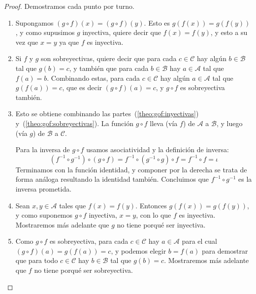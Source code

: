   \begin{proof}
    Demostramos cada punto por turno.
    \begin{enumerate}
    \item
      Supongamos \((g \circ f)(x) = (g \circ f)(y)\).
      Esto es \(g(f(x)) = g(f(y))\),
      y como supusimos \(g\) inyectiva,
      quiere decir que \(f(x) = f(y)\),
      y esto a su vez que \(x = y\) ya que \(f\) es inyectiva.
    \item
      Si \(f\) y \(g\) son sobreyectivas,
      quiere decir que para cada \(c \in \mathcal{C}\)
      hay algún \(b \in \mathcal{B}\) tal que \(g(b) = c\),
      y también que para cada \(b \in \mathcal{B}\) hay \(a \in \mathcal{A}\)
      tal que \(f(a) = b\).
      Combinando estas,
      para cada \(c \in \mathcal{C}\) hay algún \(a \in \mathcal{A}\)
      tal que \(g(f(a)) = c\),
      que es decir \((g \circ f)(a) = c\),
      y \(g \circ f\) es sobreyectiva también.
    \item
      Esto se obtiene combinando las partes~(\ref{theo:gof:inyectivas})
      y~(\ref{theo:gof:sobreyectivas}).
      La función \(g \circ f\) lleva
      (vía \(f\))
      de \(\mathcal{A}\) a \(\mathcal{B}\),
      y luego
      (vía \(g\))
      de \(\mathcal{B}\) a \(\mathcal{C}\).

      Para la inversa de \(g \circ f\)
      usamos asociatividad y la definición de inversa:
      \begin{equation*}
	(f^{-1} \circ g^{-1}) \circ (g \circ f)
	  = f^{-1} \circ (g^{-1} \circ g) \circ f
	  = f^{-1} \circ f
	  = \iota
      \end{equation*}
      Terminamos con la función identidad,
      y componer por la derecha se trata de forma análoga
      resultando la identidad también.
      Concluimos que \(f^{-1} \circ g^{-1}\) es la inversa prometida.
    \item
      Sean \(x, y \in \mathcal{A}\) tales que \(f(x) = f(y)\).
      Entonces	\(g(f(x)) = g(f(y))\),
      y como suponemos \(g \circ f\) inyectiva,
      \(x = y\),
      con lo que \(f\) es inyectiva.
      Mostraremos más adelante que \(g\) no tiene porqué ser inyectiva.
    \item
      Como \(g \circ f\) es sobreyectiva,
      para cada \(c \in \mathcal{C}\) hay \(a \in \mathcal{A}\)
      para el cual \((g \circ f)(a) = g(f(a)) = c\),
      y podemos elegir \(b = f(a)\)
      para demostrar que para todo \(c \in \mathcal{C}\)
      hay \(b \in \mathcal{B}\)
      tal que \(g(b) = c\).
      Mostraremos más adelante que \(f\) no tiene porqué ser sobreyectiva.
      \qedhere
    \end{enumerate}
  \end{proof}
